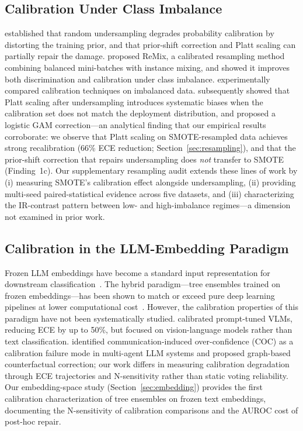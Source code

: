 \documentclass[11pt]{article}
\begin{document}
\subsection{Calibration Under Class Imbalance}

\citet{dalpozzolo2015calibrating} established that random undersampling degrades probability calibration by distorting the training prior, and that prior-shift correction and Platt scaling can partially repair the damage. \citet{bellinger2021calibrated} proposed ReMix, a calibrated resampling method combining balanced mini-batches with instance mixing, and showed it improves both discrimination and calibration under class imbalance. \citet{huang2020experimental} experimentally compared calibration techniques on imbalanced data. \citet{phelps2025platt} subsequently showed that Platt scaling after undersampling introduces systematic biases when the calibration set does not match the deployment distribution, and proposed a logistic GAM correction---an analytical finding that our empirical results corroborate: we observe that Platt scaling on SMOTE-resampled data achieves strong recalibration (66\% ECE reduction; Section~\ref{sec:resampling}), and that the prior-shift correction that repairs undersampling does \textit{not} transfer to SMOTE (Finding~1c). Our supplementary resampling audit extends these lines of work by (i) measuring SMOTE's calibration effect alongside undersampling, (ii) providing multi-seed paired-statistical evidence across five datasets, and (iii) characterizing the IR-contrast pattern between low- and high-imbalance regimes---a dimension not examined in prior work.

\subsection{Calibration in the LLM-Embedding Paradigm}

Frozen LLM embeddings have become a standard input representation for downstream classification~\cite{reimers2019sentence}. The hybrid paradigm---tree ensembles trained on frozen embeddings---has been shown to match or exceed pure deep learning pipelines at lower computational cost~\cite{grinsztajn2022tree}. However, the calibration properties of this paradigm have not been systematically studied. \citet{sharifdeen2026calibrating} calibrated prompt-tuned VLMs, reducing ECE by up to 50\%, but focused on vision-language models rather than text classification. \citet{huang2026cagecal} identified communication-induced over-confidence (COC) as a calibration failure mode in multi-agent LLM systems and proposed graph-based counterfactual correction; our work differs in measuring calibration degradation through ECE trajectories and N-sensitivity rather than static voting reliability. Our embedding-space study (Section~\ref{sec:embedding}) provides the first calibration characterization of tree ensembles on frozen text embeddings, documenting the N-sensitivity of calibration comparisons and the AUROC cost of post-hoc repair.
\end{document}
